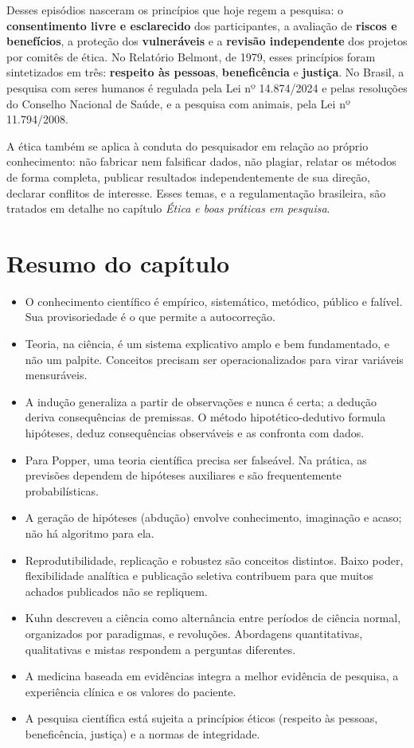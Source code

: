 \documentclass[
]{book}
\providecommand{\tightlist}{%
  \setlength{\itemsep}{0pt}\setlength{\parskip}{0pt}}
\begin{document}
Desses episódios nasceram os princípios que hoje regem a pesquisa: o \textbf{consentimento livre e esclarecido} dos participantes, a avaliação de \textbf{riscos e benefícios}, a proteção dos \textbf{vulneráveis} e a \textbf{revisão independente} dos projetos por comitês de ética. No Relatório Belmont, de 1979, esses princípios foram sintetizados em três: \textbf{respeito às pessoas}, \textbf{beneficência} e \textbf{justiça}. No Brasil, a pesquisa com seres humanos é regulada pela Lei nº 14.874/2024 e pelas resoluções do Conselho Nacional de Saúde, e a pesquisa com animais, pela Lei nº 11.794/2008.

A ética também se aplica à conduta do pesquisador em relação ao próprio conhecimento: não fabricar nem falsificar dados, não plagiar, relatar os métodos de forma completa, publicar resultados independentemente de sua direção, declarar conflitos de interesse. Esses temas, e a regulamentação brasileira, são tratados em detalhe no capítulo \emph{Ética e boas práticas em pesquisa}.

\section{Resumo do capítulo}\label{resumo-do-capuxedtulo}

\begin{itemize}
\tightlist
\item
  O conhecimento científico é empírico, sistemático, metódico, público e falível. Sua provisoriedade é o que permite a autocorreção.
\item
  Teoria, na ciência, é um sistema explicativo amplo e bem fundamentado, e não um palpite. Conceitos precisam ser operacionalizados para virar variáveis mensuráveis.
\item
  A indução generaliza a partir de observações e nunca é certa; a dedução deriva consequências de premissas. O método hipotético-dedutivo formula hipóteses, deduz consequências observáveis e as confronta com dados.
\item
  Para Popper, uma teoria científica precisa ser falseável. Na prática, as previsões dependem de hipóteses auxiliares e são frequentemente probabilísticas.
\item
  A geração de hipóteses (abdução) envolve conhecimento, imaginação e acaso; não há algoritmo para ela.
\item
  Reprodutibilidade, replicação e robustez são conceitos distintos. Baixo poder, flexibilidade analítica e publicação seletiva contribuem para que muitos achados publicados não se repliquem.
\item
  Kuhn descreveu a ciência como alternância entre períodos de ciência normal, organizados por paradigmas, e revoluções. Abordagens quantitativas, qualitativas e mistas respondem a perguntas diferentes.
\item
  A medicina baseada em evidências integra a melhor evidência de pesquisa, a experiência clínica e os valores do paciente.
\item
  A pesquisa científica está sujeita a princípios éticos (respeito às pessoas, beneficência, justiça) e a normas de integridade.
\end{itemize}
\end{document}
